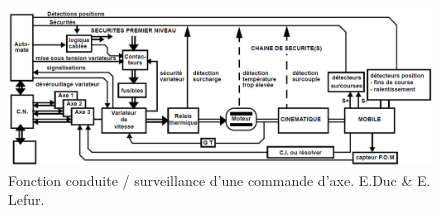 \documentclass[12pt]{article}
\begin{document}

\begin{figure}
\centering
\includegraphics[width=1\linewidth]{conduite1.PNG}
\caption{Fonction conduite / surveillance d’une commande d’axe. E.Duc \& E. Lefur.}
\label{C1}
\end{figure}

\end{document}
